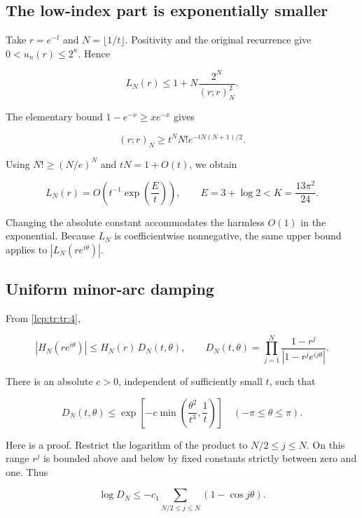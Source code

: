 \documentclass[11pt]{article}
\numberwithin{equation}{section}
\theoremstyle{definition}\newtheorem{definition}[theorem]{Definition}
\theoremstyle{remark}\newtheorem{remark}[theorem]{Remark}
\begin{document}
\subsection{The low-index part is exponentially
smaller}\label{lcp:tr:the-low-index-part-is-exponentially-smaller}

Take \(r=e^{-t}\) and \(N=\lfloor1/t\rfloor\). Positivity and the
original recurrence give \(0<u_n(r)\le2^n\). Hence

\[
L_N(r)\le 1+N\frac{2^N}{(r;r)_N^2}.
\]

The elementary bound \(1-e^{-x}\ge xe^{-x}\) gives

\[
(r;r)_N\ge t^NN!e^{-tN(N+1)/2}.
\]

Using \(N!\ge(N/e)^N\) and \(tN=1+O(t)\), we obtain

\begin{equation}\label{lcp:tr:tr:5}
L_N(r)=O\!\left(t^{-1}\exp\left(\frac{E}{t}\right)\right),
 \qquad E=3+\log2<K=\frac{13\pi^2}{24}.
\end{equation}

Changing the absolute constant accommodates the harmless
\(O(1)\) in the exponential. Because \(L_N\) is
coefficientwise nonnegative, the same upper bound applies to
\(|L_N(re^{i\theta})|\).

\subsection{Uniform minor-arc damping}\label{lcp:tr:uniform-minor-arc-damping}

From \eqref{lcp:tr:tr:4},

\begin{equation}\label{lcp:tr:tr:6}
|H_N(re^{i\theta})|\le H_N(r)\,D_N(t,\theta),\qquad
D_N(t,\theta)=\prod_{j=1}^N\frac{1-r^j}{|1-r^je^{ij\theta}|}.
\end{equation}

There is an absolute \(c>0\), independent of sufficiently small \(t\),
such that

\begin{equation}\label{lcp:tr:tr:7}
D_N(t,\theta)\le\exp\left[-c\min\left(\frac{\theta^2}{t^3},\frac1t\right)\right]
\quad(-\pi\le\theta\le\pi).
\end{equation}

Here is a proof. Restrict the logarithm of the product to
\(N/2\le j\le N\). On this range \(r^j\) is bounded above and below by
fixed constants strictly between zero and one. Thus

\[
\log D_N\le-c_1\sum_{N/2\le j\le N}(1-\cos j\theta).
\]
\end{document}
